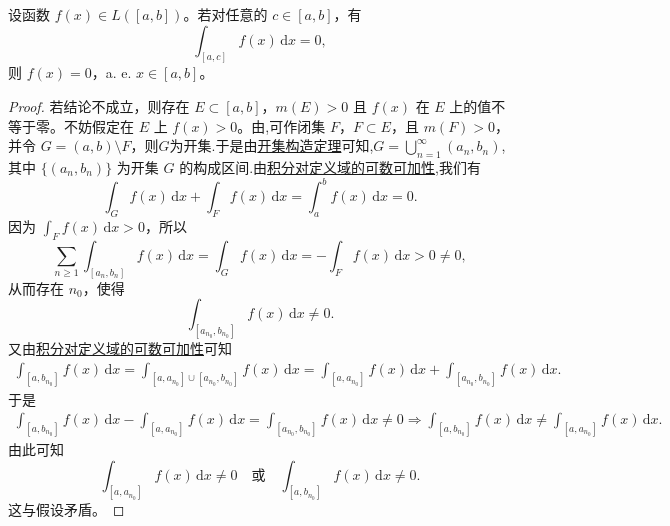\documentclass[../../main.tex]{subfiles}
\begin{document}
\begin{theorem}[可积函数几乎处处为零的一种判别法]\label{theorem:可积函数几乎处处为零的一种判别法}
设函数 $f(x) \in L([a,b])$。若对任意的 $c \in [a,b]$，有
\[
\int_{[a,c]} f(x) \, \mathrm{d}x = 0,
\]
则 $f(x) = 0$，a. e. $x \in [a,b]$。
\end{theorem}
\begin{proof}
若结论不成立，则存在 $E \subset [a,b]$，$m(E) > 0$ 且 $f(x)$ 在 $E$ 上的值不等于零。不妨假定在 $E$ 上 $f(x) > 0$。由,可作闭集 $F$，$F \subset E$，且 $m(F) > 0$，并令 $G = (a,b) \setminus F$，则$G$为开集.于是由\hyperref[theorem:开集构造定理]{开集构造定理}可知,$G=\bigcup_{n=1}^{\infty}{\left( a_n,b_n \right)}$,其中 $\{ (a_n, b_n) \}$ 为开集 $G$ 的构成区间.由\hyperref[theorem:积分对定义域的可数可加性]{积分对定义域的可数可加性},我们有
\[
\int_G f(x) \, \mathrm{d}x + \int_F f(x) \, \mathrm{d}x = \int_a^b f(x) \, \mathrm{d}x = 0.
\]
因为 $\int_F f(x) \, \mathrm{d}x > 0$，所以
\[
\sum_{n \geqslant 1} \int_{[a_n, b_n]} f(x) \, \mathrm{d}x = \int_G f(x) \, \mathrm{d}x = -\int_F f(x) \, \mathrm{d}x > 0\neq 0,
\]
从而存在 $n_0$，使得
\[
\int_{[a_{n_0}, b_{n_0}]} f(x) \, \mathrm{d}x \neq 0.
\]
又由\hyperref[theorem:积分对定义域的可数可加性]{积分对定义域的可数可加性}可知
\begin{align*}
\int_{[a,b_{n_0}]}{f(x)\,\mathrm{d}x}=\int_{[a,a_{n_0}]\cup [a_{n_0},b_{n_0}]}{f(x)\,\mathrm{d}x}=\int_{[a,a_{n_0}]}{f(x)\,\mathrm{d}x}+\int_{[a_{n_0},b_{n_0}]}{f(x)\,\mathrm{d}x.}
\end{align*}
于是
\begin{align*}
\int_{[a,b_{n_0}]}{f(x)\,\mathrm{d}x}-\int_{[a,a_{n_0}]}{f(x)\,\mathrm{d}x}=\int_{[a_{n_0},b_{n_0}]}{f(x)\,\mathrm{d}x}\ne 0\Rightarrow \int_{[a,b_{n_0}]}{f(x)\,\mathrm{d}x}\ne \int_{[a,a_{n_0}]}{f(x)\,\mathrm{d}x}.
\end{align*}
由此可知
\[
\int_{[a, a_{n_0}]} f(x) \, \mathrm{d}x \neq 0 \quad \text{或} \quad \int_{[a, b_{n_0}]} f(x) \, \mathrm{d}x \neq 0.
\]
这与假设矛盾。
\end{proof}
\end{document}
